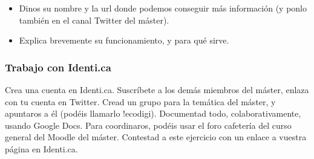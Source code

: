 \documentclass[a4paper,12pt]{article}
\begin{document}
\begin{itemize}
\item Dinos su nombre y la url donde podemos conseguir más información (y ponlo también en el canal Twitter del máster).
\item Explica brevemente su funcionamiento, y para qué sirve.
\end{itemize}

\subsubsection{Trabajo con Identi.ca}
\label{sub:identica}

Crea una cuenta en Identi.ca. Suscríbete a los demás miembros del máster, enlaza con tu cuenta en Twitter. Cread un grupo para la temática del máster, y apuntaros a él (podéis llamarlo !ecodigi). Documentad todo, colaborativamente, usando Google Docs. Para coordinaros, podéis usar el foro cafetería del curso general del Moodle del máster. Contestad a este ejercicio con un enlace a vuestra página en Identi.ca.
\end{document}
